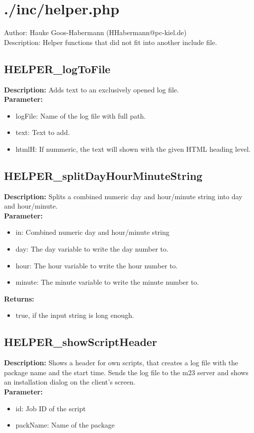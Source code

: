 \newpage\section{./inc/helper.php}
 Author: Hauke Goos-Habermann (HHabermann@pc-kiel.de)\\
 Description: Helper functions that did not fit into another include file.\\

\subsection{HELPER\_logToFile}
\textbf{Description:} Adds text to an exclusively opened log file.\\
\textbf{Parameter:}
\begin{itemize}
\item logFile: Name of the log file with full path.
\item text: Text to add.
\item htmlH: If nummeric, the text will shown with the given HTML heading level.
\end{itemize}

\subsection{HELPER\_splitDayHourMinuteString}
\textbf{Description:} Splits a combined numeric day and hour/minute string into day and hour/minute.\\
\textbf{Parameter:}
\begin{itemize}
\item in: Combined numeric day and hour/minute string
\item day: The day variable to write the day number to.
\item hour: The hour variable to write the hour number to.
\item minute: The minute variable to write the minute number to.
\end{itemize}
\textbf{Returns:}
\begin{itemize}
\item true, if the input string is long enough.
\end{itemize}

\subsection{HELPER\_showScriptHeader}
\textbf{Description:} Shows a header for own scripts, that creates a log file with the package name and the start time. Sends the log file to the m23 server and shows an installation dialog on the client's screen.\\
\textbf{Parameter:}
\begin{itemize}
\item id: Job ID of the script
\item packName: Name of the package
\end{itemize}

